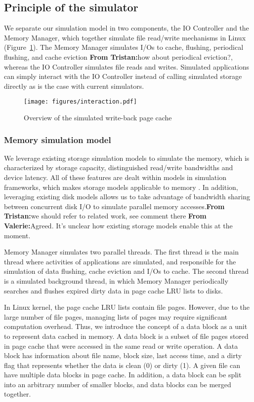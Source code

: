 \documentclass[conference]{IEEEtran}
\newcommand{\tristan}[1]{\color{orange}\textbf{From Tristan:}#1\color{black}}
\newcommand{\valerie}[1]{\color{blue}\textbf{From Valerie:}#1\color{black}}
\begin{document}
		\subsection{Principle of the simulator}
	
            We separate our simulation model in two components, the IO
			Controller and the Memory Manager, which together simulate 
			file read/write mechanisms in Linux (Figure~\ref{fig:interaction}). 
			The Memory Manager simulates I/Os to cache, flushing, periodical flushing, 
			and cache eviction \tristan{how about periodical eviction?}, whereas the IO Controller simulates file reads and writes. 
			Simulated applications can simply interact with the IO Controller instead of 
			calling simulated storage directly as is the case with current simulators.

			\begin{figure}
   				\centering
   				\texttt{[image: figures/interaction.pdf]}
   				\caption{Overview of the simulated write-back page cache}\label{fig:interaction}
			\end{figure}	

			\subsubsection{Memory simulation model}
			
			We leverage existing storage simulation models to simulate the memory,
			which is characterized by storage capacity, distinguished read/write 
			bandwidths and device latency. 
			All of these features are dealt within models in simulation 
			frameworks, which makes storage models applicable to memory \cite{lebre2015}. 
			In addition, leveraging existing disk models allows us 
			to take advantage of bandwidth sharing between concurrent disk I/O to 
			simulate parallel memory accesses.\tristan{we should refer to related work, 
            see comment there} \valerie{Agreed. It's unclear how existing storage models enable this at the moment}.

			Memory Manager simulates two parallel threads. The first thread is the 
			main thread where activities of applications are simulated, and responsible 
			for the simulation of data flushing, cache eviction and I/Os to cache. 
			The second thread is a simulated background thread, in which Memory Manager 
			periodically searches and flushes expired dirty data in page cache LRU lists 
			to disks. 

			In Linux kernel, the page cache LRU lists contain file pages. However, 
			due to the large number of file pages, managing lists of pages may 
			require significant computation overhead. 
			Thus, we introduce the concept of a data block as a unit to represent data 
			cached in memory. A data block is a subset of file pages stored in
            page cache that were accessed in the same read or write operation. 
			A data block has information about file name, block size, last access 
			time, and a dirty flag that represents whether the data is clean (0) 
			or dirty (1). 
			A given file can have multiple data blocks in page cache. In
			addition, a data block can be split into an arbitrary number of
			smaller blocks, and data blocks can be merged together.
\end{document}
